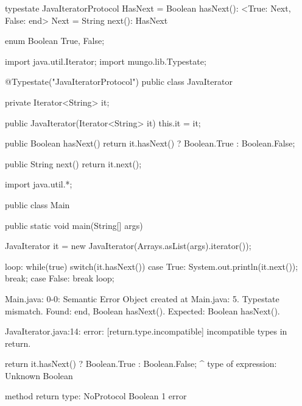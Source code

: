 \begin{code}
typestate JavaIteratorProtocol {
  HasNext = {
    Boolean hasNext(): <True: Next, False: end>
  }
  Next = {
    String next(): HasNext
  }
}\end{code}

\begin{code}
enum Boolean {
	True, False;
}\end{code}

\begin{code}
import java.util.Iterator;
import mungo.lib.Typestate;

@Typestate("JavaIteratorProtocol")
public class JavaIterator {

  private Iterator<String> it;

  public JavaIterator(Iterator<String> it) {
    this.it = it;
  }

	public Boolean hasNext() {
    return it.hasNext() ? Boolean.True : Boolean.False;
  }

  public String next() {
    return it.next();
  }

}\end{code}

\begin{code}
import java.util.*;

public class Main {
	public static void main(String[] args) {
		JavaIterator it = new JavaIterator(Arrays.asList(args).iterator());

    loop: while(true) {
      switch(it.hasNext()) {
        case True:
          System.out.println(it.next());
          break;
        case False:
          break loop;
      }
    }
	}
}\end{code}

\lstset{language=,caption=Mungo's output}
\begin{code}

Main.java: 0-0: Semantic Error
		Object created at Main.java: 5. Typestate mismatch. Found: end, Boolean hasNext(). Expected: Boolean hasNext().
\end{code}

\lstset{language=,caption=Our tool's output}
\begin{code}
JavaIterator.java:14: error: [return.type.incompatible] incompatible types in return.

    return it.hasNext() ? Boolean.True : Boolean.False;
                        ^
  type of expression: Unknown Boolean

  method return type: NoProtocol Boolean
1 error
\end{code}

